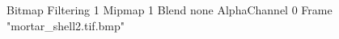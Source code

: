 {Bitmap
	{Filtering 1}
	{Mipmap 1}
	{Blend none}
	{AlphaChannel 0}
	{Frame "mortar_shell2.tif.bmp"}
}

